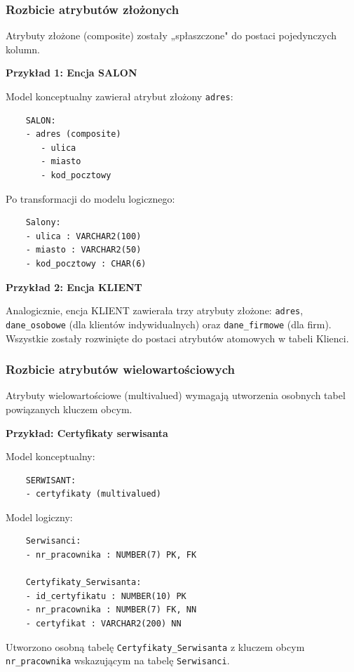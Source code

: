 \documentclass[a4paper,titleauthor]{mwart}
\begin{document}
	\subsubsection{Rozbicie atrybutów złożonych}

	Atrybuty złożone (composite) zostały „spłaszczone" do postaci pojedynczych kolumn.

	\textbf{Przykład 1: Encja SALON}

	Model konceptualny zawierał atrybut złożony \texttt{adres}:

	\begin{verbatim}
	SALON:
	- adres (composite)
	   - ulica
	   - miasto
	   - kod_pocztowy
	\end{verbatim}

	Po transformacji do modelu logicznego:

	\begin{verbatim}
	Salony:
	- ulica : VARCHAR2(100)
	- miasto : VARCHAR2(50)
	- kod_pocztowy : CHAR(6)
	\end{verbatim}

	\textbf{Przykład 2: Encja KLIENT}

	Analogicznie, encja KLIENT zawierała trzy atrybuty złożone: \texttt{adres}, \texttt{dane\_osobowe} (dla klientów indywidualnych) oraz \texttt{dane\_firmowe} (dla firm). Wszystkie zostały rozwinięte do postaci atrybutów atomowych w tabeli Klienci.

	\subsubsection{Rozbicie atrybutów wielowartościowych}

	Atrybuty wielowartościowe (multivalued) wymagają utworzenia osobnych tabel powiązanych kluczem obcym.

	\textbf{Przykład: Certyfikaty serwisanta}

	Model konceptualny:
	\begin{verbatim}
	SERWISANT:
	- certyfikaty (multivalued)
	\end{verbatim}

	Model logiczny:
	\begin{verbatim}
	Serwisanci:
	- nr_pracownika : NUMBER(7) PK, FK

	Certyfikaty_Serwisanta:
	- id_certyfikatu : NUMBER(10) PK
	- nr_pracownika : NUMBER(7) FK, NN
	- certyfikat : VARCHAR2(200) NN
	\end{verbatim}

	Utworzono osobną tabelę \texttt{Certyfikaty\_Serwisanta} z kluczem obcym \texttt{nr\_pracownika} wskazującym na tabelę \texttt{Serwisanci}.
\end{document}
